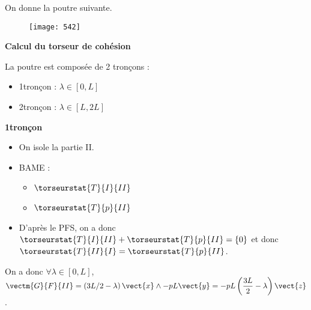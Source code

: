 \normaltrue
\correctionfalse


\setcounter{question}{0}%

\ifcorrection
\else
{}
\fi

On donne la poutre suivante. 




\begin{figure}[H]
\centering
\texttt{[image: 542]}
\end{figure}

\ifprof
%
%
\textbf{Calcul du torseur de cohésion}

La poutre est composée de 2 tronçons :
\begin{itemize}
\item 1\ier tronçon : $\lambda\in[0,L]$
\item 2\ieme tronçon : $\lambda\in[L,2L]$
\end{itemize}

\textbf{1\ier tronçon}
\begin{itemize}
\item On isole la partie II.
\item BAME : 
\begin{itemize}
\item $\torseurstat{T}{I}{II}$
\item $\torseurstat{T}{p}{II}$
\end{itemize}
\item D'après le PFS, on a donc $\torseurstat{T}{I}{II} + \torseurstat{T}{p}{II} = \{0\}$ et donc 
$\torseurstat{T}{II}{I} =  \torseurstat{T}{p}{II}$.
\end{itemize}
On a donc $\forall \lambda\in[0,L]$, $\vectm{G}{F}{II}=  \left(3L/2-\lambda\right)\vect{x} \wedge - pL\vect{y} =- pL \left(\dfrac{3L}{2}-\lambda\right) \vect{z} $. 

